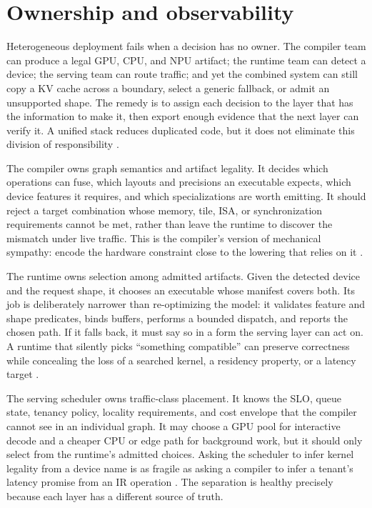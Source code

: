 \section{Ownership and observability}
\label{sec:ch24_ownership_observability}

Heterogeneous deployment fails when a decision has no owner. The compiler team can produce a legal GPU, CPU, and NPU artifact; the runtime team can detect a device; the serving team can route traffic; and yet the combined system can still copy a KV cache across a boundary, select a generic fallback, or admit an unsupported shape. The remedy is to assign each decision to the layer that has the information to make it, then export enough evidence that the next layer can verify it. A unified stack reduces duplicated code, but it does not eliminate this division of responsibility \citep{iree2024,yirage2026}.

The compiler owns graph semantics and artifact legality. It decides which operations can fuse, which layouts and precisions an executable expects, which device features it requires, and which specializations are worth emitting. It should reject a target combination whose memory, tile, ISA, or synchronization requirements cannot be met, rather than leave the runtime to discover the mismatch under live traffic. This is the compiler's version of mechanical sympathy: encode the hardware constraint close to the lowering that relies on it \citep{nvidia2022hopper,amd2024aie,yirage2026}.

The runtime owns selection among admitted artifacts. Given the detected device and the request shape, it chooses an executable whose manifest covers both. Its job is deliberately narrower than re-optimizing the model: it validates feature and shape predicates, binds buffers, performs a bounded dispatch, and reports the chosen path. If it falls back, it must say so in a form the serving layer can act on. A runtime that silently picks ``something compatible'' can preserve correctness while concealing the loss of a searched kernel, a residency property, or a latency target \citep{iree2024,rotem2018glow}.

The serving scheduler owns traffic-class placement. It knows the SLO, queue state, tenancy policy, locality requirements, and cost envelope that the compiler cannot see in an individual graph. It may choose a GPU pool for interactive decode and a cheaper CPU or edge path for background work, but it should only select from the runtime's admitted choices. Asking the scheduler to infer kernel legality from a device name is as fragile as asking a compiler to infer a tenant's latency promise from an IR operation \citep{patel2025llminference,kwon2023vllm}. The separation is healthy precisely because each layer has a different source of truth.

